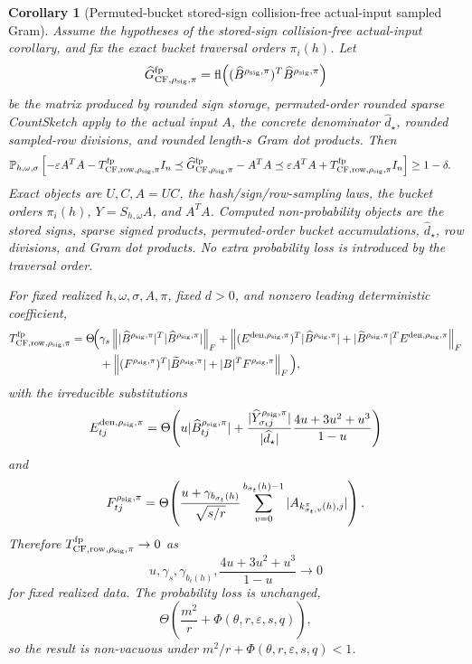 \documentclass[11pt]{article}
\newcommand{\Prob}{\mathbb{P}}
\newcommand{\Frob}[1]{\left\lVert #1\right\rVert_F}
\newcommand{\fl}{\operatorname{fl}}
\newcommand{\I}{I}
\newcommand{\eps}{\varepsilon}
\newtheorem{corollary}[theorem]{Corollary}
\theoremstyle{remark}
\begin{document}
\begin{corollary}[Permuted-bucket stored-sign collision-free actual-input sampled Gram]
Assume the hypotheses of the stored-sign collision-free actual-input
corollary, and fix the exact bucket traversal orders \(\pi_i(h)\).  Let
\[
  \widehat G_{{\rm CF},\rho_{\rm sig},\pi}^{\rm fp}
  =
  \fl\!\left(
    (\widehat B^{\rho_{\rm sig},\pi})^T
    \widehat B^{\rho_{\rm sig},\pi}\right)
\]
be the matrix produced by rounded sign storage, permuted-order rounded sparse
CountSketch apply to the actual input \(A\), the concrete denominator
\(\widehat d_\star\), rounded sampled-row divisions, and rounded length-\(s\)
Gram dot products.  Then
\[
\begin{aligned}
&\Prob_{h,\omega,\sigma}
  \left[
    -\eps A^TA
    -T_{{\rm CF,row},\rho_{\rm sig},\pi}^{\rm fp}\I_n
    \preceq
    \widehat G_{{\rm CF},\rho_{\rm sig},\pi}^{\rm fp}-A^TA
    \preceq
    \eps A^TA
    +T_{{\rm CF,row},\rho_{\rm sig},\pi}^{\rm fp}\I_n
  \right]
  \ge 1-\delta .
\end{aligned}
\]
Exact objects are \(U,C,A=UC\), the hash/sign/row-sampling laws, the bucket
orders \(\pi_i(h)\), \(Y=S_{h,\omega}A\), and \(A^TA\).  Computed
non-probability objects are the stored signs, sparse signed products,
permuted-order bucket accumulations, \(\widehat d_\star\), row divisions, and
Gram dot products.  No extra probability loss is introduced by the traversal
order.

For fixed realized \(h,\omega,\sigma,A,\pi\), fixed \(d>0\), and nonzero
leading deterministic coefficient,
\[
\begin{aligned}
  T_{{\rm CF,row},\rho_{\rm sig},\pi}^{\rm fp}
  =
  \Theta\!\Big(
  &\gamma_s\Frob{
      |\widehat B^{\rho_{\rm sig},\pi}|^T
      |\widehat B^{\rho_{\rm sig},\pi}|}
  +
  \Frob{
      (E^{{\rm den},\rho_{\rm sig},\pi})^T
      |\widehat B^{\rho_{\rm sig},\pi}|
      +
      |\widetilde B^{\rho_{\rm sig},\pi}|^T
      E^{{\rm den},\rho_{\rm sig},\pi}}
  \\
  &+
  \Frob{
      (F^{\rho_{\rm sig},\pi})^T
      |\widetilde B^{\rho_{\rm sig},\pi}|
      +
      |B|^TF^{\rho_{\rm sig},\pi}}
  \Big),
\end{aligned}
\]
with the irreducible substitutions
\[
  E^{{\rm den},\rho_{\rm sig},\pi}_{tj}
  =
  \Theta\!\left(
    u|\widehat B^{\rho_{\rm sig},\pi}_{tj}|
    +
    \frac{|\widehat Y^{\rho_{\rm sig},\pi}_{\sigma_tj}|}
         {|\widehat d_\star|}
    \frac{4u+3u^2+u^3}{1-u}
  \right)
\]
and
\[
  F^{\rho_{\rm sig},\pi}_{tj}
  =
  \Theta\!\left(
    \frac{u+\gamma_{b_{\sigma_t}(h)}}{\sqrt{s/r}}
    \sum_{v=0}^{b_{\sigma_t}(h)-1}
      |A_{k_{\sigma_t,v}^{\pi}(h),j}|
  \right).
\]
Therefore \(T_{{\rm CF,row},\rho_{\rm sig},\pi}^{\rm fp}\to0\) as
\[
  u,\gamma_s,\gamma_{b_i(h)},\frac{4u+3u^2+u^3}{1-u}\to0
\]
for fixed realized data.  The probability loss is unchanged,
\[
  \Theta\!\left(\frac{m^2}{r}+\Phi(\theta,r,\eps,s,q)\right),
\]
so the result is non-vacuous under
\(m^2/r+\Phi(\theta,r,\eps,s,q)<1\).
\end{corollary}
\end{document}
